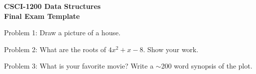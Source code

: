 \documentclass[10pt]{article}
\begin{document}
\begin{center}
  \LARGE \textbf{
    CSCI-1200 Data Structures \\
    Final Exam Template}
\end{center}

Problem 1: Draw a picture of a house.

\fbox{\parbox{6.9in}{ \ \vspace{4in} \ }}

\vspace{0.2in}



Problem 2: What are the roots of $ 4x^2 + x -8 $.  Show your work.

\fbox{\parbox{6.9in}{ \ \vspace{4in} \ }}

\newpage

Problem 3: What is your favorite movie?  Write a $\sim$200 word
synopsis of the plot.

\fbox{\parbox{6.9in}{ \ \vspace{9.5in} \ }}

\newpage




\end{document}
